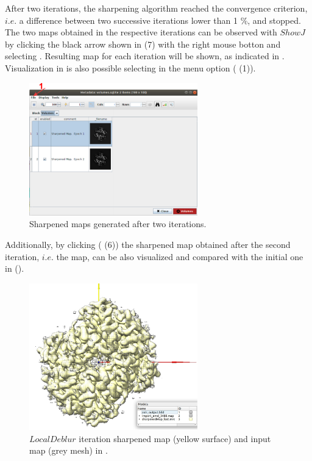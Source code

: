After two iterations, the sharpening algorithm reached the convergence criterion, $i.e.$ a difference between two successive iterations lower than 1 \%, and stopped. The two maps obtained in the respective iterations can be observed with $ShowJ$ by clicking the black arrow shown in  (7) with the right mouse botton and selecting . Resulting map for each iteration will be shown, as indicated in .  Visualization in \chimera is also possible selecting  in the menu option  ( (1)). 

\begin{figure}[H]
  \centering 
  \captionsetup{width=.7\linewidth} 
  \includegraphics[width=0.65\textwidth]
  {Images/Fig59}
  \caption{Sharpened maps generated after two iterations.}
  \label{fig:localdeblur_2}
  \end{figure}
  
Additionally, by clicking  ( (6)) the sharpened map obtained after the second iteration, $i.e.$ the  map, can be also visualized and compared with the initial one in \chimera ().


\begin{figure}[H]
  \centering 
  \captionsetup{width=.7\linewidth} 
  \includegraphics[width=0.65\textwidth]
  {Images/Fig64}
  \caption{$LocalDeblur$  iteration sharpened map (yellow surface) and input map (grey mesh) in \chimera.}
  \label{fig:localdeblur_3}
  \end{figure}
 
